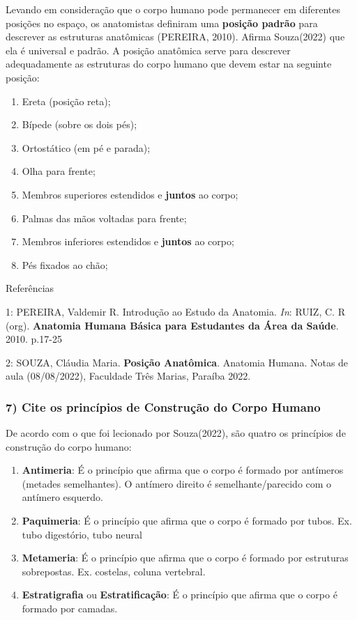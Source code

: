 \documentclass[
]{book}
\providecommand{\tightlist}{%
  \setlength{\itemsep}{0pt}\setlength{\parskip}{0pt}}
\begin{document}
Levando em consideração que o corpo humano pode permanecer em diferentes posições no espaço, os anatomistas definiram uma \textbf{posição padrão} para descrever as estruturas anatômicas (PEREIRA, 2010). Afirma Souza(2022) que ela é universal e padrão. A posição anatômica serve para descrever adequadamente as estruturas do corpo humano que devem estar na seguinte posição:

\begin{enumerate}
\def\labelenumi{\arabic{enumi}.}
\tightlist
\item
  Ereta (posição reta);
\item
  Bípede (sobre os dois pés);
\item
  Ortostático (em pé e parada);
\item
  Olha para frente;
\item
  Membros superiores estendidos e \textbf{juntos} ao corpo;
\item
  Palmas das mãos voltadas para frente;
\item
  Membros inferiores estendidos e \textbf{juntos} ao corpo;
\item
  Pés fixados ao chão;
\end{enumerate}

Referências

1: PEREIRA, Valdemir R. Introdução ao Estudo da Anatomia. \emph{In}: RUIZ, C. R (org). \textbf{Anatomia Humana Básica para Estudantes da Área da Saúde}. 2010. p.17-25

2: SOUZA, Cláudia Maria. \textbf{Posição Anatômica}. Anatomia Humana. Notas de aula (08/08/2022), Faculdade Três Marias, Paraíba 2022.

\hypertarget{cite-os-princuxedpios-de-construuxe7uxe3o-do-corpo-humano}{%
\subsubsection*{7) Cite os princípios de Construção do Corpo Humano}\label{cite-os-princuxedpios-de-construuxe7uxe3o-do-corpo-humano}}

De acordo com o que foi lecionado por Souza(2022), são quatro os princípios de construção do corpo humano:

\begin{enumerate}
\def\labelenumi{\arabic{enumi}.}
\tightlist
\item
  \textbf{Antimeria}: É o princípio que afirma que o corpo é formado por antímeros (metades semelhantes). O antímero direito é semelhante/parecido com o antímero esquerdo.
\item
  \textbf{Paquimeria}: É o princípio que afirma que o corpo é formado por tubos. Ex. tubo digestório, tubo neural
\item
  \textbf{Metameria}: É o princípio que afirma que o corpo é formado por estruturas sobrepostas. Ex. costelas, coluna vertebral.
\item
  \textbf{Estratigrafia} ou \textbf{Estratificação}: É o princípio que afirma que o corpo é formado por camadas.
\end{enumerate}
\end{document}
